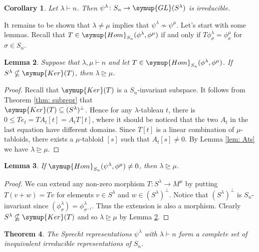 \documentclass{assignment}[2019/10/15]
\theoremstyle{plain}
\newtheorem{theorem}{Theorem}[section]
\newtheorem{lemma}[theorem]{Lemma}
\newtheorem{corollary}[theorem]{Corollary}
\newcommand{\Kernal}{\mathop{}\!\symup{Ker}}
\newcommand{\Hom}{\mathop{}\!\symup{Hom}}
\newcommand{\GL}{\mathop{}\!\symup{GL}}
\numberwithin{equation}{section}
\begin{document}
    \begin{corollary}
        Let $\lambda\vdash n$. Then $\psi^\lambda\colon S_n\to \GL(S^\lambda)$ is irreducible.
    \end{corollary}

    It remains to be shown that $\lambda\neq\mu$ implies that $\psi^\lambda\nsim\psi^\mu$. Let's start with some lemmas. Recall that $T\in \Hom_{S_n}(\phi^\lambda, \phi^\mu)$ if and only if $T\phi^\lambda_\sigma = \phi^\mu_\sigma$ for $\sigma\in S_n$.

    \begin{lemma}\label{lem: T-hom}
        Suppose that $\lambda, \mu\vdash n$ and let $T\in \Hom_{S_n}(\phi^\lambda, \phi^\mu)$. If $S^\lambda\nsubseteq \Kernal(T)$, then $\lambda\unrhd \mu$.
    \end{lemma}

    \begin{proof}
        Recall that $\Kernal(T)$ is a $S_n$-invariant subspace. It follows from Theorem \ref{thm: subrepr} that\\ $\Kernal(T)\subseteq(S^\lambda)^\perp$. Hence for any $\lambda$-tableau $t$, there is $0\leq Te_t = TA_t[t]=A_tT[t]$, where it should be noticed that the two $A_t$ in the last equation have different domains. Since $T[t]$ is a linear combination of $\mu$-tabloids, there exists a $\mu$-tabloid $[s]$ such that $A_t[s]\neq 0$. By Lemma \ref{lem: Ats} we have $\lambda\unrhd\mu$.
    \end{proof}

    \begin{lemma}\label{lem: hom-ker}
        If $\Hom_{S_n}(\psi^\lambda, \phi^\mu)\neq 0$, then $\lambda\unrhd \mu$.
    \end{lemma}

    \begin{proof}
        We can extend any non-zero morphism $T\colon S^\lambda\to M^\mu$ by putting $T(v+w)=Tv$ for elements $v\in S^\lambda$ and $w\in (S^\lambda)^\perp$. Notice that $(S^\lambda)^\perp$ is $S_n$-invariant since $(\phi_\sigma^\lambda)=\phi_{\sigma^{-1}}^\lambda$. Thus the extension is also a morphism. Clearly $S^\lambda\nsubseteq\Kernal(T)$ and so $\lambda\unrhd\mu$ by Lemma \ref{lem: T-hom}.
    \end{proof}

    \begin{theorem}
        The Sprecht representations $\psi^\lambda$ with $\lambda\vdash n$ form a complete set of inequivalent irreducible representations of $S_n$.
    \end{theorem}
\end{document}
